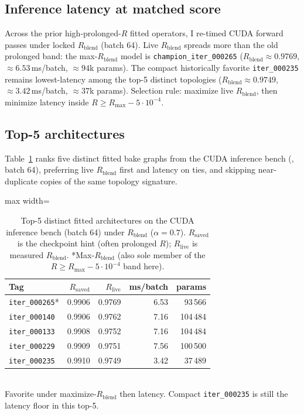 \subsection{Inference latency at matched score}
\label{sec:inference-latency}
Across the prior high-prolonged-$R$ fitted operators, I re-timed CUDA forward passes under locked $R_{\mathrm{blend}}$ (batch 64).
Live $R_{\mathrm{blend}}$ spreads more than the old prolonged band: the max-$R_{\mathrm{blend}}$ model is
\texttt{champion\_iter\_000265} ($R_{\mathrm{blend}}{\approx}0.9769$, $\approx 6.53$\,ms/batch, $\approx 94$k params).
The compact historically favorite \texttt{iter\_000235} remains lowest-latency among the top-5 distinct topologies
($R_{\mathrm{blend}}{\approx}0.9749$, $\approx 3.42$\,ms/batch, $\approx 37$k params).
Selection rule: maximize live $R_{\mathrm{blend}}$, then minimize latency inside $R\ge R_{\max}-5\cdot10^{-4}$.

\subsection{Top-5 architectures}
\label{sec:top5-arch}
Table~\ref{tab:top5} ranks five distinct fitted bake graphs from the CUDA inference bench
(, batch 64), preferring live $R_{\mathrm{blend}}$ first and latency on ties,
and skipping near-duplicate copies of the same topology signature.

\begin{table}[htbp]
  \centering
  \caption{Top-5 distinct fitted architectures on the CUDA inference bench (batch 64) under $R_{\mathrm{blend}}$ ($\alpha{=}0.7$).
  $R_{\mathrm{saved}}$ is the checkpoint hint (often prolonged $R$); $R_{\mathrm{live}}$ is measured $R_{\mathrm{blend}}$.
  *Max-$R_{\mathrm{blend}}$ (also sole member of the $R\ge R_{\max}-5\cdot10^{-4}$ band here).}
  \label{tab:top5}
  \setlength{\tabcolsep}{3pt}
  \begin{adjustbox}{max width=\columnwidth}
\begin{tabular}{@{}lrrrr@{}}
    \toprule
    Tag & $R_{\mathrm{saved}}$ & $R_{\mathrm{live}}$ & ms/batch & params \\
    \midrule
    \texttt{iter\_000265}* & 0.9906 & 0.9769 & 6.53 & 93\,566 \\
    \texttt{iter\_000140} & 0.9906 & 0.9762 & 7.16 & 104\,484 \\
    \texttt{iter\_000133} & 0.9908 & 0.9752 & 7.16 & 104\,484 \\
    \texttt{iter\_000229} & 0.9909 & 0.9751 & 7.56 & 100\,500 \\
    \texttt{iter\_000235} & 0.9910 & 0.9749 & 3.42 & 37\,489 \\
    \bottomrule
  \end{tabular}
\end{adjustbox}\\[0.4em]
  {\footnotesize *Favorite under maximize-$R_{\mathrm{blend}}$ then latency. Compact \texttt{iter\_000235} is still the latency floor in this top-5.}
\end{table}

